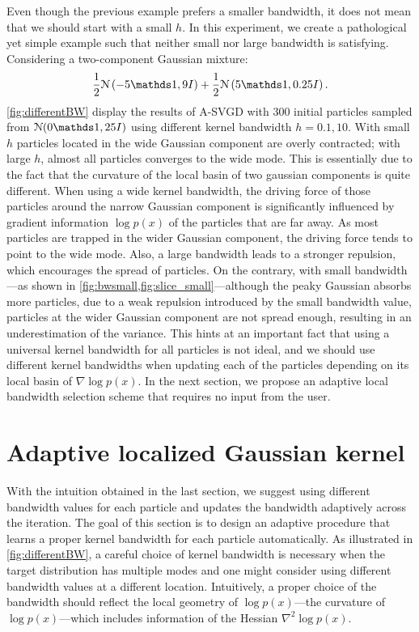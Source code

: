 Even though the previous example prefers a smaller bandwidth, it does not
mean that we should start with a small $h$.
In this experiment, we create a pathological yet simple example such that
neither small nor large bandwidth is satisfying.
Considering a two-component Gaussian mixture:
\[
\frac{1}{2}\distNorm\left( -5 \ind, 9I \right)  + \frac{1}{2}\distNorm\left( 5\ind, 0.25I \right).
\]
\cref{fig:differentBW} display the results of A-SVGD with $300$ initial
particles sampled from $\distNorm(0\ind, 25I )$ using different kernel
bandwidth $h = 0.1, 10$. With small $h$ particles located in the wide
Gaussian component are overly contracted; with large $h$, almost all
particles converges to the wide mode.
This is essentially due to the fact that the curvature of the local basin of
two gaussian components is quite different. When using a wide kernel
bandwidth, the driving force of those particles around the narrow Gaussian
component is significantly influenced by gradient information $\log p(x)$ of
the particles that are far away. As most particles are trapped in the wider
Gaussian component, the driving force tends to point to the wide mode. Also,
a large bandwidth leads to a stronger repulsion, which encourages the spread
of particles. On the contrary, with small bandwidth---as shown in
\cref{fig:bwsmall,fig:slice_small}---although the peaky Gaussian absorbs more
particles, due to a weak repulsion introduced by the small bandwidth value,
particles at the wider Gaussian component are not spread enough, resulting in
an underestimation of the variance.
This hints at an important fact that using a universal kernel bandwidth for
all particles is not ideal, and we should use different kernel bandwidths
when updating each of the particles depending on its local basin of $\nabla
\log p(x)$. In the next section, we propose an adaptive local bandwidth
selection scheme that requires no input from the user.




\section{Adaptive localized Gaussian kernel} \label{sec:bw}

With the intuition obtained in the last section, we suggest using different
bandwidth values for each particle and updates the bandwidth adaptively
across the iteration. The goal of this section is to design an adaptive
procedure that learns a proper kernel bandwidth for each particle
automatically. As illustrated in \cref{fig:differentBW}, a careful choice of
kernel bandwidth is necessary when the target distribution has multiple modes
and one might consider using different bandwidth values at a different
location. Intuitively, a proper choice of the bandwidth should reflect the
local geometry of $\log p(x)$---the curvature of $\log p(x)$---which includes
information of the Hessian $\nabla^2 \log p(x)$.

